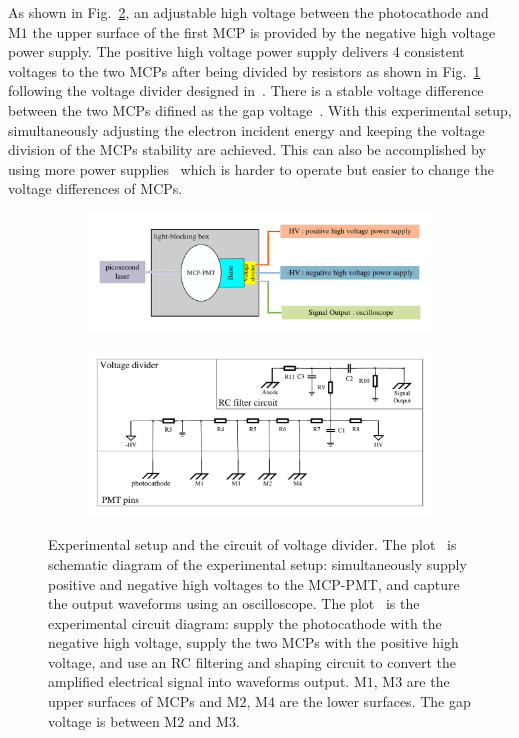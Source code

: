 As shown in Fig.~\ref{fig:circuit}, an adjustable high voltage between the photocathode and $\mathrm{M}1$ the upper surface of the first MCP
is provided by the negative high voltage power supply.
The positive high voltage power supply delivers 4 consistent voltages to the two MCPs
after being divided by resistors as shown in Fig.~\ref{fig:setup} following the voltage divider designed in~\cite{Luo:2023jdf}.
There is a stable voltage difference between the two MCPs difined as the gap voltage~\cite{2017MCP}.
With this experimental setup,
simultaneously adjusting the electron incident energy
and keeping the voltage division of the MCPs stability are achieved.
This can also be accomplished by using more power supplies~\cite{2017MCP}
which is harder to operate but easier to change the voltage differences of MCPs.
\begin{figure}[ht]
    \centering
    \begin{subfigure}{\textwidth}
        \centering
        \includegraphics[width=0.7\linewidth]{pic/setup.pdf}
        \caption{}
        \label{fig:setup}
    \end{subfigure}
    \vspace{0.5cm}
    \begin{subfigure}{\textwidth}
        \centering
        \includegraphics[width=0.7\linewidth]{pic/circuit.pdf}
        \caption{}
        \label{fig:circuit}
    \end{subfigure}
    \caption{Experimental setup and the circuit of voltage divider.
        The plot~ is schematic diagram of the experimental setup:
        simultaneously supply positive and negative high voltages to the MCP-PMT,
        and capture the output waveforms using an oscilloscope.
        The plot~ is the experimental circuit diagram:
        supply the photocathode with the negative high voltage,
        supply the two MCPs with the positive high voltage,
        and use an RC filtering and shaping circuit
        to convert the amplified electrical signal into waveforms output.
        $\mathrm{M}1$, $\mathrm{M}3$ are the upper surfaces of MCPs
        and $\mathrm{M}2$, $\mathrm{M}4$ are the lower surfaces.
        The gap voltage is between $\mathrm{M}2$ and $\mathrm{M}3$.}
    \label{fig:mainfig}
\end{figure}

